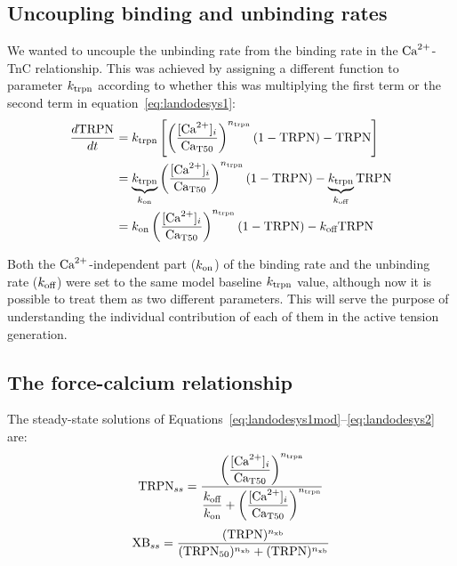 

%
%
%
\subsection{Uncoupling binding and unbinding rates}
We wanted to uncouple the unbinding rate from the binding rate in the $\textrm{Ca}^{2+}$-TnC relationship. This was achieved by assigning a different function to parameter $k_{\textrm{trpn}}$ according to whether this was multiplying the first term or the second term in equation~\eqref{eq:landodesys1}:
%
\begin{align}
    \frac{d\text{TRPN}}{dt} &=k_{\textrm{trpn}}\left[\left(\frac{[\textrm{Ca}^{2+}]_{i}}{\textrm{Ca}_{\textrm{T}50}}\right)^{n_{\textrm{trpn}}}(1-\textrm{TRPN})-\textrm{TRPN}\right] \\
    &= \underbrace{k_{\textrm{trpn}}}_{k_{\textrm{on}}}\left(\frac{[\textrm{Ca}^{2+}]_{i}}{\textrm{Ca}_{\textrm{T}50}}\right)^{n_{\textrm{trpn}}}(1-\textrm{TRPN})-\underbrace{k_{\textrm{trpn}}}_{k_{\textrm{off}}}\textrm{TRPN} \\
    &= k_{\textrm{on}}\left(\frac{[\textrm{Ca}^{2+}]_{i}}{\textrm{Ca}_{\textrm{T}50}}\right)^{n_{\textrm{trpn}}}(1-\textrm{TRPN})-k_{\textrm{off}}\textrm{TRPN} \label{eq:landodesys1mod}
\end{align}

\vspace{0.2cm}\noindent
Both the $\textrm{Ca}^{2+}$-independent part ($k_{\textrm{on}}$) of the binding rate and the unbinding rate ($k_{\textrm{off}}$) were set to the same model baseline $k_{\textrm{trpn}}$ value, although now it is possible to treat them as two different parameters. This will serve the purpose of understanding the individual contribution of each of them in the active tension generation.


%
%
%
\subsection{The force-calcium relationship}\label{sec:ch2theforcecalciumrelationship}
The steady-state solutions of Equations~\eqref{eq:landodesys1mod}--\eqref{eq:landodesys2} are:
%
\begin{equation}\label{eq:landodesys1_ss}
    \textrm{TRPN}_{ss} = \dfrac{\left(\dfrac{[\textrm{Ca}^{2+}]_{i}}{\textrm{Ca}_{\textrm{T}50}}\right)^{n_{\textrm{trpn}}}}{\dfrac{k_{\textrm{off}}}{k_{\textrm{on}}}+\left(\dfrac{[\textrm{Ca}^{2+}]_{i}}{\textrm{Ca}_{\textrm{T}50}}\right)^{n_{\textrm{trpn}}}}
\end{equation}
%
\begin{equation}\label{eq:landodesys2_ss}
    \textrm{XB}_{ss} = \frac{(\textrm{TRPN})^{n_{\textrm{xb}}}}{(\textrm{TRPN}_{50})^{n_{\textrm{xb}}}+(\textrm{TRPN})^{n_{\textrm{xb}}}}
\end{equation}


